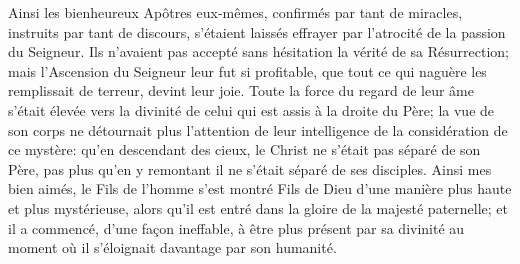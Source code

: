 Ainsi les bienheureux Apôtres eux-mêmes,
	confirmés par tant de miracles, instruits par tant de discours,
	s’étaient laissés effrayer par l’atrocité de la passion du Seigneur.
Ils n’avaient pas accepté sans hésitation la vérité de sa Résurrection;
	mais l’Ascension du Seigneur leur fut si profitable,
	que tout ce qui naguère les remplissait de terreur, devint leur joie.
Toute la force du regard de leur âme
	s’était élevée vers la divinité de celui qui est assis à la droite du Père;
	la vue de son corps ne détournait plus l’attention de leur intelligence
		de la considération de ce mystère:
	qu’en descendant des cieux, le Christ ne s’était pas séparé de son Père,
	pas plus qu’en y remontant il ne s’était séparé de ses disciples.
Ainsi mes bien aimés, le Fils de l’homme s’est montré Fils de Dieu
	d’une manière plus haute et plus mystérieuse,
	alors qu’il est entré dans la gloire de la majesté paternelle;
	et il a commencé, d’une façon ineffable,
	à être plus présent par sa divinité
	au moment où il s’éloignait davantage par son humanité.
